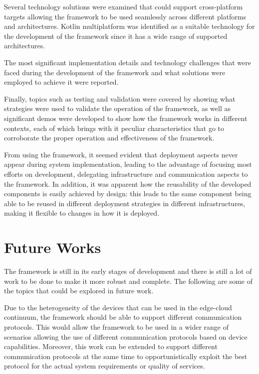 Several technology solutions were examined that could support cross-platform targets allowing the framework to be used seamlessly across different
platforms and architectures. Kotlin multiplatform was identified as a suitable technology for the development of the framework since it has a wide
range of supported architectures.

The most significant implementation details and technology challenges that were faced during the development of the framework and what solutions were
employed to achieve it were reported.

Finally, topics such as testing and validation were covered by showing what strategies were used to validate the operation of the framework, as well
as significant demos were developed to show how the framework works in different contexts, each of which brings with it peculiar characteristics that
go to corroborate the proper operation and effectiveness of the framework.

From using the framework, it seemed evident that deployment aspects never appear during system implementation, leading to the advantage of focusing
most efforts on development, delegating infrastructure and communication aspects to the framework. In addition, it was apparent how the reusability
of the developed components is easily achieved by design: this leads to the same component being able to be reused in different deployment strategies
in different infrastructures, making it flexible to changes in how it is deployed.

\section{Future Works}
\label{sec:future-works}

The framework is still in its early stages of development and there is still a lot of work to be done to make it more robust and complete. The
following are some of the topics that could be explored in future work.

Due to the heterogeneity of the devices that can be used in the edge-cloud continuum, the framework should be able to support different
communication protocols. This would allow the framework to be used in a wider range of scenarios allowing the use of different communication
protocols based on device capabilities. Moreover, this work can be extended to support different communication protocols at the same time to
opportunistically exploit the best protocol for the actual system requirements or quality of services.

